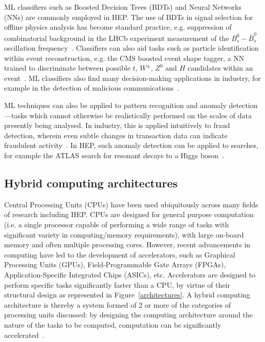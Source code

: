 ML classifiers such as Boosted Decision Trees (BDTs) and Neural Networks (NNs) are commonly employed in HEP. The use of BDTs in signal selection for offline physics analysis has become standard practice, e.g. suppression of combinatorial background in the LHCb experiment measurement of the $B_s^0-\bar{B}_s^0$ oscillation frequency~\cite{delta-ms}. Classifiers can also aid tasks such as particle identification within event reconstruction, e.g. the CMS boosted event shape tagger, a NN trained to discriminate between possible $t$, $W^\pm$, $Z^0$ and $H$ candidates within an event~\cite{CMS-best}. ML classifiers also find many decision-making applications in industry, for example in the detection of malicious communications~\cite{classifier-phishing}.

ML techniques can also be applied to pattern recognition and anomaly detection—tasks which cannot otherwise be realistically performed on the scales of data presently being analysed. In industry, this is applied intuitively to fraud detection, wherein even subtle changes in transaction  data can indicate fraudulent activity~\cite{fraud-detection}. In HEP, such anomaly detection can be applied to searches, for example the ATLAS search for resonant decays to a Higgs boson~\cite{anomaly-hep}.

\subsection{Hybrid computing architectures}
\label{hybrid-architectures}
Central Processing Units (CPUs) have been used ubiquitously across many fields of research including HEP. CPUs are designed for general purpose computation (i.e. a single processor capable of performing a wide range of tasks with significant variety in computing/memory requirements), with large on-board memory and often multiple processing cores. However, recent advancements in computing have led to the development of accelerators, such as Graphical Processing Units (GPUs), Field-Programmable Gate Arrays (FPGAs), Application-Specific Integrated Chips (ASICs), etc. Accelerators are designed to perform specific tasks significantly faster than a CPU, by virtue of their structural design as represented in Figure~\ref{architectures}. A hybrid computing architecture is thereby a system formed of $2$ or more of the categories of processing units discussed: by designing the computing architecture around the nature of the tasks to be computed, computation can be significantly accelerated~\cite{architectures}.

